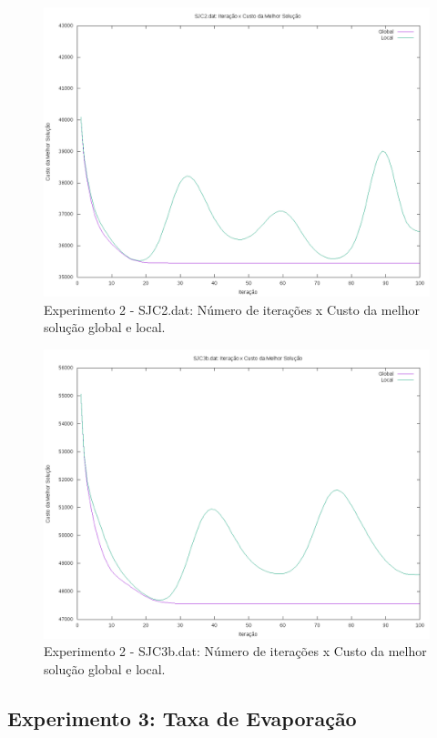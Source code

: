 \documentclass[12pt]{article}
\begin{document}
\begin{figure}[!htbp]
  \centering
  \includegraphics[width=1\textwidth]{exp2s2.png}
  \caption{Experimento 2 - SJC2.dat: Número de iterações x Custo da melhor solução global e local.}
  \label{fig:exp2s2}
\end{figure}

\begin{figure}[!htbp]
  \centering
  \includegraphics[width=1\textwidth]{exp2s3.png}
  \caption{Experimento 2 - SJC3b.dat: Número de iterações x Custo da melhor solução global e local.}
  \label{fig:exp2s3}
\end{figure}

\subsection{Experimento 3: Taxa de Evaporação}
\end{document}
